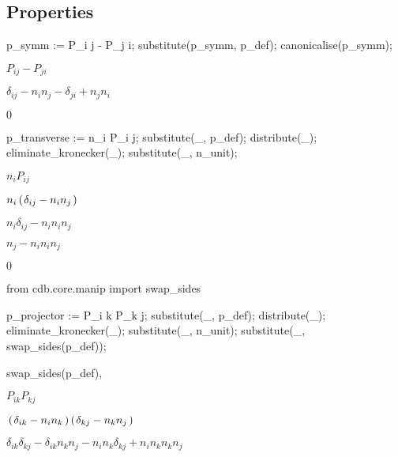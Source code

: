 \documentclass[10pt]{article}
\newcommand\brwrap[3]{%
  \setbox0=\hbox{$#2$}
  \left#1\vbox to \the\ht0{\hbox to 0pt{}}\right.\kern-.2em
  \begingroup #2\endgroup\kern-.15em
  \left.\vbox to \the\ht0{\hbox to 0pt{}}\right#3
}
\begin{document}
\subsection*{Properties}
\begin{python}
p_symm := P_{i j} - P_{j i};
substitute(p_symm, p_def);
canonicalise(p_symm);
\end{python}
\begin{adjustwidth}{1em}{0cm}${}P_{i j}-P_{j i}$\end{adjustwidth}
\begin{adjustwidth}{1em}{0cm}${}\delta_{i j}-n_{i} n_{j}-\delta_{j i}+n_{j} n_{i}$\end{adjustwidth}
\begin{adjustwidth}{1em}{0cm}${}0$\end{adjustwidth}
\begin{python}
p_transverse := n_{i} P_{i j};
substitute(_, p_def);
distribute(_);
eliminate_kronecker(_);
substitute(_, n_unit);
\end{python}
\begin{adjustwidth}{1em}{0cm}${}n_{i} P_{i j}$\end{adjustwidth}
\begin{adjustwidth}{1em}{0cm}${}n_{i} \brwrap{(}{\delta_{i j}-n_{i} n_{j}}{)}$\end{adjustwidth}
\begin{adjustwidth}{1em}{0cm}${}n_{i} \delta_{i j}-n_{i} n_{i} n_{j}$\end{adjustwidth}
\begin{adjustwidth}{1em}{0cm}${}n_{j}-n_{i} n_{i} n_{j}$\end{adjustwidth}
\begin{adjustwidth}{1em}{0cm}${}0$\end{adjustwidth}
\begin{python}
from cdb.core.manip import swap_sides

p_projector := P_{i k } P_{k j};
substitute(_, p_def);
distribute(_);
eliminate_kronecker(_);
substitute(_, n_unit);
substitute(_, swap_sides(p_def));

swap_sides(p_def),
\end{python}
\begin{adjustwidth}{1em}{0cm}${}P_{i k} P_{k j}$\end{adjustwidth}
\begin{adjustwidth}{1em}{0cm}${}\brwrap{(}{\delta_{i k}-n_{i} n_{k}}{)} \brwrap{(}{\delta_{k j}-n_{k} n_{j}}{)}$\end{adjustwidth}
\begin{adjustwidth}{1em}{0cm}${}\delta_{i k} \delta_{k j}-\delta_{i k} n_{k} n_{j}-n_{i} n_{k} \delta_{k j}+n_{i} n_{k} n_{k} n_{j}$\end{adjustwidth}
\end{document}
